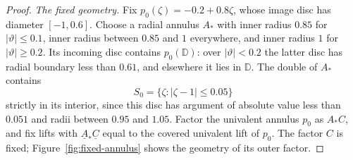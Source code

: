 \begin{proof}
\emph{The fixed geometry.}
Fix
$p_0(\zeta)=-0.2+0.8\zeta$, whose image disc has diameter $[-1,0.6]$.
Choose a radial annulus $A_*$ with inner radius $0.85$ for
$|\vartheta|\leq0.1$, inner radius between $0.85$ and $1$ everywhere,
and inner radius $1$ for $|\vartheta|\geq0.2$.
Its incoming disc contains $p_0(\mathbb D)$: over $|\vartheta|<0.2$
the latter disc has radial boundary less than $0.61$, and elsewhere it
lies in $\mathbb D$.  The double of $A_*$ contains
\[
 S_0=\{\zeta:|\zeta-1|\leq0.05\}
\]
strictly in its interior, since this disc has argument of absolute value
less than $0.051$ and radii between $0.95$ and $1.05$.
Factor the univalent annulus $p_0$ as $A_*C$, and fix lifts with
$\underline A_*\underline C$ equal to the covered univalent lift of
$p_0$.  The factor $C$ is fixed; Figure~\ref{fig:fixed-annulus} shows
the geometry of its outer factor.


\end{proof}
